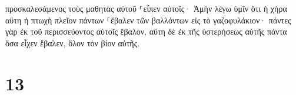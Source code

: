 \documentclass{openreader}
\begin{document}
προσκαλεσάμενος τοὺς μαθητὰς αὐτοῦ ⸀εἶπεν αὐτοῖς· Ἀμὴν λέγω ὑμῖν ὅτι ἡ χήρα αὕτη ἡ πτωχὴ πλεῖον πάντων ⸀ἔβαλεν τῶν βαλλόντων εἰς τὸ γαζοφυλάκιον· πάντες γὰρ ἐκ τοῦ περισσεύοντος αὐτοῖς ἔβαλον, αὕτη δὲ ἐκ τῆς ὑστερήσεως αὐτῆς πάντα ὅσα εἶχεν ἔβαλεν, ὅλον τὸν βίον αὐτῆς. \section*{13}
\end{document}
